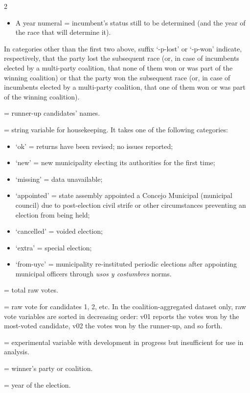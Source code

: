 \documentclass[letter,12pt]{article}
\begin{document}
\begin{singlespace}
\begin{multicols}{2}
\begin{footnotesize}
\begin{description}
\begin{itemize}
  \item A year numeral = incumbent's status still to be determined (and the year of the race that will determine it).
  \end{itemize}
In categories other than the first two above, suffix `-p-lost' or `-p-won' indicate, respectively, that the party lost the subsequent race (or, in case of incumbents elected by a multi-party coalition, that none of them won or was part of the winning coalition) or that the party won the subsequent race (or, in case of incumbents elected by a multi-party coalition, that one of them won or was part of the winning coalition).
\item[runnerup] = runner-up candidates' names.
\item[status] = string variable for housekeeping. It takes one of the following categories:
  \begin{itemize}
  \item `ok' = returns have been revised; no issues reported;
  \item `new' = new municipality electing its authorities for the first time;
  \item `missing' = data unavailable;
  \item `appointed' = state assembly appointed a Concejo Municipal (municipal council) due to post-election civil strife or other circumstances preventing an election from being held;
  \item `cancelled' = voided election;
  \item `extra' = special election;
  \item `from-uyc' = municipality re-instituted periodic elections after appointing municipal officers through \emph{usos y costumbres} norms.
  \end{itemize}
\item[tot] = total raw votes.
\item[v01, v02, ...] = raw vote for candidates 1, 2, etc. In the coalition-aggregated dataset only, raw vote variables are sorted in decreasing order: v01 reports the votes won by the most-voted candidate, v02 the votes won by the runner-up, and so forth.
\item[who] = experimental variable with development in progress but insufficient for use in analysis.
\item[win] = winner's party or coalition.
\item[yr] = year of the election.
\end{description}

\end{footnotesize}

\end{multicols}






\end{singlespace}
\end{document}
